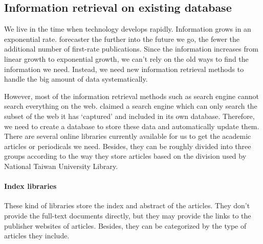 	
\subsection{Information retrieval on existing database}
	We live in the time when technology develops rapidly. Information grows in an exponential rate. \cite{Tague1981} forecaster the further into the future we go, the fewer the additional number of first-rate publications. 
	Since the information increases from linear growth to exponential growth, we can't rely on the old ways to find the information we need. 
	Instead, we need new information retrieval methods to handle the big amount of data systematically. 
	
	However, most of the information retrieval methods such as search engine cannot search everything on the web. 
	\cite{Grehan2002} claimed a search engine which can only search the subset of the web it has ‘captured’ and included in its own database. 
	Therefore, we need to create a database to store these data and automatically update them.
	There are several online libraries currently available for us to get the academic articles or periodicals we need.
	Besides, they can be roughly divided into three groups according to the way they store articles based on the division used by National Taiwan University Library.

\paragraph{Index libraries}
	These kind of libraries store the index and abstract of the articles.
	They don't provide the full-text documents directly, but they may provide the links to the publisher websites of articles.
	Besides, they can be categorized by the type of articles they include.
	
